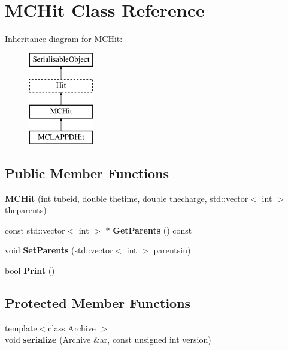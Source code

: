 \hypertarget{classMCHit}{\section{M\-C\-Hit Class Reference}
\label{classMCHit}
}
Inheritance diagram for M\-C\-Hit\-:\begin{figure}[H]
\begin{center}
\leavevmode
\includegraphics[height=4.000000cm]{classMCHit}
\end{center}
\end{figure}
\subsection*{Public Member Functions}
\begin{DoxyCompactItemize}
\item 
\hypertarget{classMCHit_aba6eea2703353998e3cdf5a23d388afc}{{\bfseries M\-C\-Hit} (int tubeid, double thetime, double thecharge, std\-::vector$<$ int $>$ theparents)}\label{classMCHit_aba6eea2703353998e3cdf5a23d388afc}

\item 
\hypertarget{classMCHit_af2a1f4ef53e27bd1c5962a1b61c784d0}{const std\-::vector$<$ int $>$ $\ast$ {\bfseries Get\-Parents} () const }\label{classMCHit_af2a1f4ef53e27bd1c5962a1b61c784d0}

\item 
\hypertarget{classMCHit_a18ae6be9fd39527f915e628ffe65dbec}{void {\bfseries Set\-Parents} (std\-::vector$<$ int $>$ parentsin)}\label{classMCHit_a18ae6be9fd39527f915e628ffe65dbec}

\item 
\hypertarget{classMCHit_a2d016ae3a18d9194a9a45a890f978833}{bool {\bfseries Print} ()}\label{classMCHit_a2d016ae3a18d9194a9a45a890f978833}

\end{DoxyCompactItemize}
\subsection*{Protected Member Functions}
\begin{DoxyCompactItemize}
\item 
\hypertarget{classMCHit_a8d516d5a6aeb3dd2f1b2e00b6532dcb5}{{\footnotesize template$<$class Archive $>$ }\\void {\bfseries serialize} (Archive \&ar, const unsigned int version)}\label{classMCHit_a8d516d5a6aeb3dd2f1b2e00b6532dcb5}

\end{DoxyCompactItemize}
